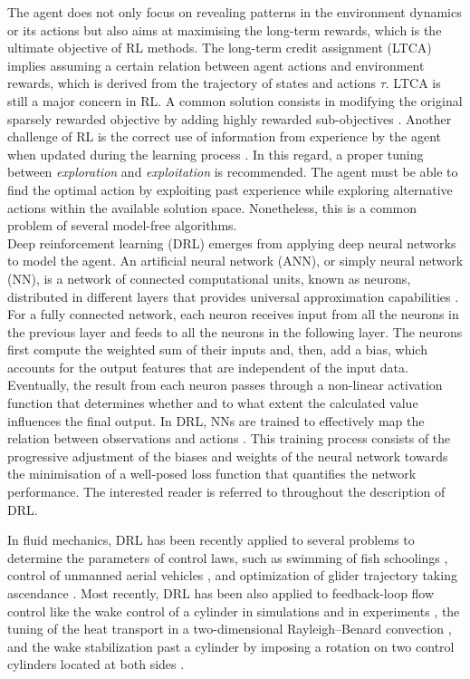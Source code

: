 The agent does not only focus on revealing patterns in the environment dynamics or its actions but also aims at maximising the long-term rewards, which is the ultimate objective of RL methods. The long-term credit assignment (LTCA) implies assuming a certain relation between agent actions and environment rewards, which is derived from the trajectory of states and actions $\tau$. LTCA is still a major concern in RL. A common solution consists in modifying the original sparsely rewarded objective by adding highly rewarded sub-objectives \citep{schaul2015app}. Another challenge of RL is the correct use of information from experience by the agent when updated during the learning process \citep{Novati2019gliding}. In this regard, a proper tuning between \textit{exploration} and \textit{exploitation} is recommended. The agent must be able to find the optimal action by exploiting past experience while exploring alternative actions within the available solution space. Nonetheless, this is a common problem of several model-free algorithms.\\

Deep reinforcement learning (DRL) emerges from applying deep neural networks to model the agent. An artificial neural network (ANN), or simply neural network (NN), is a network of connected computational units, known as neurons, distributed in different layers that provides universal approximation capabilities \citep{Hornik1989MLP,Siegelmann1995NN}. For a fully connected network, each neuron receives input from all the neurons in the previous layer and feeds to all the neurons in the following layer. The neurons first compute the weighted sum of their inputs and, then, add a bias, which accounts for the output features that are independent of the input data. Eventually, the result from each neuron passes through a non-linear activation function that determines whether and to what extent the calculated value influences the final output. In DRL, NNs are trained to effectively map the relation between observations and actions \citep{rabault2019DRL}. This training process consists of the progressive adjustment of the biases and weights of the neural network towards the minimisation of a well-posed loss function that quantifies the network performance. The interested reader is referred to \citet{Goodfellow2016book} throughout the description of DRL.

In fluid mechanics, DRL has been recently applied to several problems to determine the parameters of control laws, such as swimming of fish schoolings \citep{gazzola2014RL}, control of unmanned aerial vehicles \citep{bohn2019DRL}, and optimization of glider trajectory taking ascendance \citep{reddy_learning_2016}. Most recently, DRL has been also applied to feedback-loop flow control like the wake control of a cylinder in simulations \citep{rabault2019DRL,rabault2019JFM} and in experiments \citep{Fan2020}, the tuning of the heat transport in a two-dimensional Rayleigh–Benard convection \citep{Beintema2020controlRBC}, and the wake stabilization past a cylinder by imposing a rotation on two control cylinders located at both sides \citep{Xu2020joh}.

